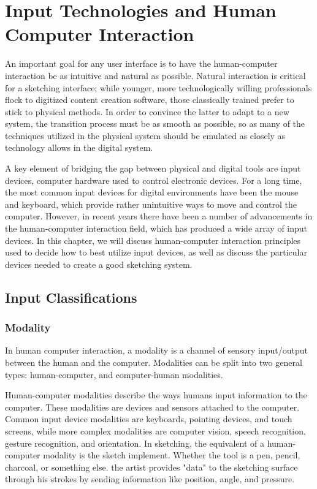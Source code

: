 \chapter{Input Technologies and Human Computer Interaction}
\label{ch:input}

An important goal for any user interface is to have the human-computer interaction be as intuitive and natural as possible.
Natural interaction is critical for a sketching interface; while younger, more technologically willing professionals flock to digitized content creation software, those classically trained prefer to stick to physical methods.
In order to convince the latter to adapt to a new system, the transition process must be as smooth as possible, so as many of the techniques utilized in the physical system should be emulated as closely as technology allows in the digital system.

A key element of bridging the gap between physical and digital tools are input devices, computer hardware used to control electronic devices.
For a long time, the most common input devices for digital environments have been the mouse and keyboard, which provide rather unintuitive ways to move and control the computer.
However, in recent years there have been a number of advancements in the human-computer interaction field, which has produced a wide array of input devices.
In this chapter, we will discuss human-computer interaction principles used to decide how to best utilize input devices, as well as discuss the particular devices needed to create a good sketching system.



\section{Input Classifications}

\subsection{Modality}

In human computer interaction, a modality is a channel of sensory input/output between the human and the computer. Modalities can be split into two general types: human-computer, and computer-human modalities.

Human-computer modalities describe the ways humans input information to the computer.
These modalities are devices and sensors attached to the computer.
Common input device modalities are keyboards, pointing devices, and touch screens, while more complex modalities are computer vision, speech recognition, gesture recognition, and orientation.
In sketching, the equivalent of a human-computer modality is the sketch implement. 
Whether the tool is a pen, pencil, charcoal, or something else. the artist provides "data" to the sketching surface through his strokes by sending information like position, angle, and pressure.

